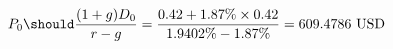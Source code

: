 \begin{align*}
P_{0}\should\frac{(1+g)D_{0}}{r-g}=\frac{0.42+1.87\%\times0.42}{1.9402\%-1.87\%}=609.4786\text{ USD}
\end{align*}
